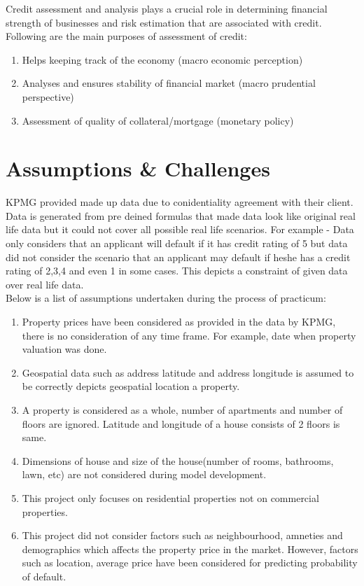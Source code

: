 Credit assessment and analysis plays a crucial role in determining financial strength of businesses and risk estimation that are associated with credit. Following are the main purposes of assessment of credit:
\begin{enumerate}
\item Helps keeping track of the economy (macro economic perception) 
\item Analyses and ensures stability of financial market (macro prudential perspective)
\item Assessment of quality of collateral/mortgage (monetary policy)
\end{enumerate}

\section{Assumptions \& Challenges}

KPMG provided made up data due to conidentiality agreement with their client. Data is generated from pre deined formulas that made data look like original real life data but it could not cover all possible real life scenarios. For example - Data only considers that an applicant will default if it has credit rating of 5 but data did not consider the scenario that an applicant may default if he\/she has a credit rating of 2,3,4 and even 1 in some cases. This depicts a constraint of given data over real life data.\\

Below is a list of assumptions undertaken during the process of practicum:
\begin{enumerate}
\item Property prices have been considered as provided in the data by KPMG, there is no consideration of any time frame. For example, date when property valuation was done. 
\item Geospatial data such as address latitude and address longitude is assumed to be correctly depicts geospatial location a property.
\item A property is considered as a whole, number of apartments and number of floors are ignored. Latitude and longitude of a house consists of 2 floors is same.
\item Dimensions of house and size of the house(number of rooms, bathrooms, lawn, etc) are not considered during model development.
\item This project only focuses on residential properties not on commercial properties. 
\item This project did not consider factors such as neighbourhood, amneties and demographics which affects the property price in the market. However, factors such as location, average price have been considered for predicting probability of default.
\end{enumerate}

